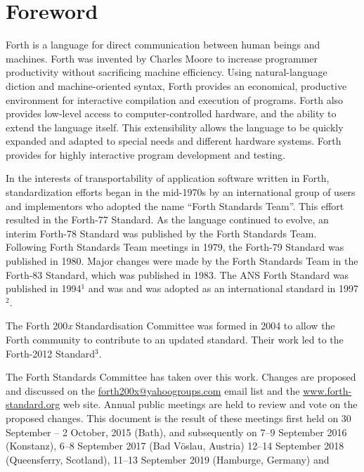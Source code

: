 
\vspace*{-6ex}\chapter*{Foreword}
\label{foreword}

Forth is a language for direct communication between human beings and
machines. Forth was invented by Charles Moore to increase programmer
productivity without sacrificing machine efficiency.
Using natural-language diction and machine-oriented syntax,
Forth provides an economical, productive environment for interactive
compilation and execution of programs. Forth also provides low-level
access to computer-controlled hardware, and the ability to extend the
language itself. This extensibility allows the language to be quickly
expanded and adapted to special needs and different hardware systems.
Forth provides for highly interactive program development and testing.

In the interests of transportability of application software written in
Forth, standardization efforts began in the mid-1970s by an international
group of users and implementors who adopted the name ``Forth Standards Team''.
This effort resulted in the Forth-77 Standard. As the language continued
to evolve, an interim Forth-78 Standard was published by the Forth Standards
Team. Following Forth Standards Team meetings in 1979, the Forth-79 Standard
was published in 1980. Major changes were made by the Forth Standards Team
in the Forth-83 Standard, which was published in 1983.
The ANS Forth Standard was published in 1994$^1$ and was
and was adopted as an international standard in 1997$^2$.




The Forth 200\emph{x} Standardisation Committee was formed in 2004
to allow the Forth community to contribute to an updated standard.
Their work led to the Forth-2012 Standard$^3$.

The Forth Standards Committee has taken over this work.  
Changes are proposed and discussed on the
\href{email:forth200x@yahoogroups.com}{forth200x@yahoogroups.com}
email list and the \href{href://www.forth-standard.org/}{www.forth-standard.org}
web site.
Annual public meetings are held to review and vote on the proposed changes.
This document is the result of these meetings first held on
30 September -- 2 October, 2015 (Bath), and subsequently on
7--9 September 2016 (Konstanz),
6--8 September 2017 (Bad V\"oslau, Austria)
12--14 September 2018 (Queensferry, Scotland),
11--13 September 2019 (Hamburge, Germany)
and 
